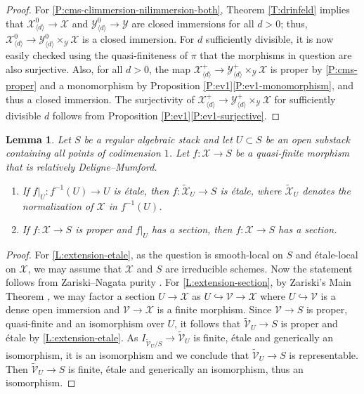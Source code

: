 \documentclass[a4paper]{amsart}
\theoremstyle{plain}
\newtheorem{lemma}[theorem]{Lemma}
\theoremstyle{definition}
\theoremstyle{remark}
\numberwithin{equation}{section}
\newcommand\cV{\mathcal{V}}
\newcommand\cX{\mathcal{X}}
\newcommand\cY{\mathcal{Y}}
\newcommand\co{\colon}
\renewcommand{\tilde}{\widetilde}
\newcommand{\itemref}[1]{\eqref{#1}}
\newcommand{\normin}[2]{\tilde{#1}_{#2}}
\begin{document}
\begin{proof}
For \itemref{P:cms-climmersion-nilimmersion-both}, Theorem
\ref{T:drinfeld} implies that $\cX^0_{\langle d \rangle} \to \cX$ and
$\cY^0_{\langle d \rangle} \to \cY$ are closed immersions for all $d>0$;
thus,
$\cX^0_{\langle d \rangle} \to \cY^0_{\langle d \rangle} \times_{\cY}
\cX$ is a closed immersion. For $d$ sufficiently divisible, it is now
easily checked using the quasi-finiteness of $\pi$ that the morphisms in question are also surjective. Also, for all $d>0$, the map $\cX_{\langle d \rangle}^+ \to \cY_{\langle d \rangle}^+ \times_{\cY} \cX$ is proper by
 \eqref{P:cms-proper} and a monomorphism by Proposition \ref{P:ev1}\eqref{P:ev1-monomorphism}, and thus a closed immersion.  The surjectivity of $\cX_{\langle d \rangle}^+ \to \cY_{\langle d \rangle}^+ \times_{\cY} \cX$ for sufficiently divisible $d$ follows from Proposition \ref{P:ev1}\eqref{P:ev1-surjective}.
\end{proof}

\begin{lemma} \label{L:extension}
Let $S$ be a regular algebraic stack and let $U \subset S$ be an open substack containing all points of codimension $1$.  Let $f \co \cX \to S$ be a quasi-finite morphism that is relatively Deligne--Mumford.
\begin{enumerate}
	\item \label{L:extension-etale}
	If $f|_U \co f^{-1}(U) \to U$ is \'etale, then $f \co \normin{\cX}{U} \to S$ is \'etale, where $\normin{\cX}{U}$ denotes the normalization of $\cX$ in $f^{-1}(U)$. 
	\item \label{L:extension-section}
	If $f \co \cX \to S$ is proper and $f|_U$ has a section, then $f \co \cX \to S$ has a section.
\end{enumerate}
\end{lemma}

\begin{proof}
For \eqref{L:extension-etale}, as the question is smooth-local on $S$ and \'etale-local on $\cX$, we may assume that $\cX$ and $S$ are irreducible schemes. Now the statement follows from Zariski--Nagata purity \cite[Exp.~X, Cor.~3.3]{sga1}.  For \eqref{L:extension-section}, by Zariski's Main Theorem \cite[Thm.~16.5(ii)]{MR1771927}, we may factor a section $U \to \cX$ as $U \hookrightarrow \cV \to \cX$ where $U \hookrightarrow {\cV}$ is a dense open immersion and ${\cV} \to \cX$ is a finite morphism. Since $\cV\to S$ is proper, quasi-finite and an isomorphism over $U$, it follows that $\normin{{\cV}}{U} \to S$ is proper and \'etale by \eqref{L:extension-etale}.  As $I_{\normin{{\cV}}{U}/S} \to \normin{{\cV}}{U}$ is finite, \'etale and generically an isomorphism, it is an isomorphism and we conclude that $\normin{{\cV}}{U}\to S$ is representable.  Then $\normin{{\cV}}{U} \to S$ is finite, \'etale and generically an isomorphism, thus an isomorphism.  
\end{proof}
\end{document}
